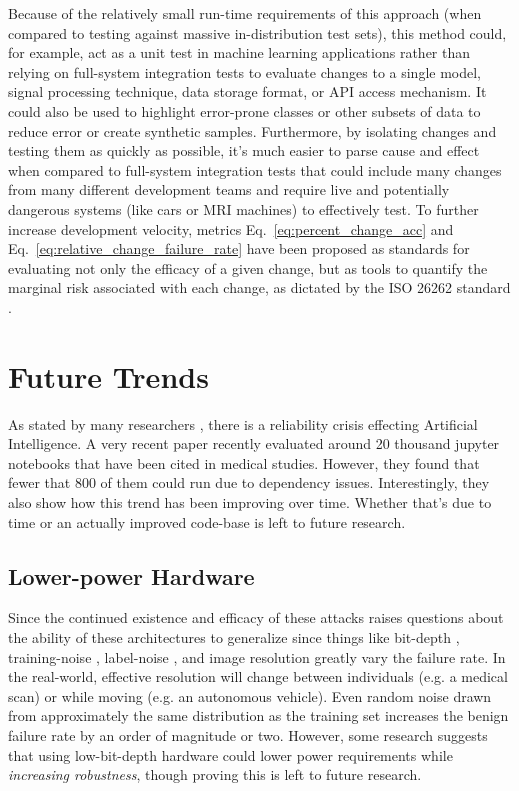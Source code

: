 \documentclass[conference]{IEEEtran}
\begin{document}
Because of the relatively small run-time requirements of this approach (when compared to testing against massive in-distribution test sets), this method could, for example, act as a unit test in machine learning applications rather than relying on full-system integration tests to evaluate changes to a single model, signal processing technique, data storage format, or API access mechanism. It could also be used to highlight error-prone classes or other subsets of data to reduce error or create synthetic samples. Furthermore, by isolating changes and testing them as quickly as possible, it's much easier to parse cause and effect when compared to full-system integration tests that could include many changes from many different development teams and require live and potentially dangerous systems (like cars or MRI machines) to effectively test. To further increase development velocity,  metrics  Eq.~\ref{eq:percent_change_acc} and Eq.~\ref{eq:relative_change_failure_rate} have been proposed \cite{meyers_1} as standards for evaluating not only the efficacy of a given change, but as tools to quantify the marginal risk associated with each change, as dictated by the ISO 26262 standard \cite{iso26262}.

\section{Future Trends}

As stated by many researchers \cite{madry2017towards, carlini_towards_2017, croce_reliable_2020, meyers_1}, there is a reliability crisis effecting Artificial Intelligence. A very recent paper \cite{samuel2023computational} recently evaluated around 20 thousand jupyter notebooks that have been cited in medical studies. However, they found that fewer that 800 of them could run due to dependency issues. Interestingly, they also show how this trend has been improving over time. Whether that's due to time or an actually improved code-base is left to future research. 

\subsection{Lower-power Hardware}
Since the continued existence and efficacy of these attacks raises questions about the ability of these architectures to generalize since things like bit-depth \cite{feature_squeezing}, training-noise \cite{gauss_aug}, label-noise \cite{gauss_out}, and image resolution \cite{meyers} greatly vary the failure rate. In the real-world, effective resolution will change between individuals (e.g. a medical scan) or while moving (e.g. an autonomous vehicle). Even random noise drawn from approximately the same distribution as the training set\cite{gauss_aug, gauss_out} increases the benign failure rate by an order of magnitude or two. However, some research \cite{meyers_1} suggests that using low-bit-depth hardware could lower power requirements while \textit{increasing robustness}, though proving this is left to future research.
\end{document}
